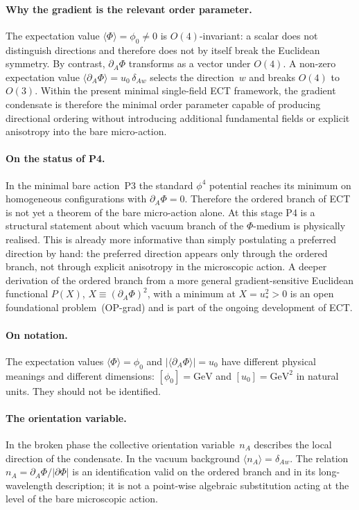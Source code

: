 \documentclass[11pt,a4paper]{article}
\numberwithin{equation}{section}
\begin{document}
\paragraph{Why the gradient is the relevant order parameter.}
The expectation value $\langle\Phi\rangle=\phi_0\neq 0$ is
$O(4)$-invariant: a scalar does not distinguish directions and therefore
does not by itself break the Euclidean symmetry.
By contrast, $\partial_A\Phi$ transforms as a vector under $O(4)$.
A non-zero expectation value
$\langle\partial_A\Phi\rangle = u_0\,\delta_{Aw}$
selects the direction~$w$ and breaks $O(4)$ to $O(3)$.
Within the present minimal single-field ECT framework, the gradient
condensate is therefore the minimal order parameter capable of producing
directional ordering without introducing additional fundamental fields
or explicit anisotropy into the bare micro-action.

\paragraph{On the status of P4.}
In the minimal bare action~P3 the standard $\phi^4$ potential reaches
its minimum on homogeneous configurations with $\partial_A\Phi=0$.
Therefore the ordered branch of ECT is not yet a theorem of the bare
micro-action alone.
At this stage P4 is a structural statement about which vacuum branch
of the $\Phi$-medium is physically realised.
This is already more informative than simply postulating a preferred
direction by hand: the preferred direction appears only through the
ordered branch, not through explicit anisotropy in the microscopic
action.
A deeper derivation of the ordered branch from a more general
gradient-sensitive Euclidean functional $P(X)$,
$X\equiv(\partial_A\Phi)^2$, with a minimum at $X=u_*^2>0$ is
an open foundational problem~(OP-grad) and is part of the ongoing
development of ECT.

\paragraph{On notation.}
The expectation values $\langle\Phi\rangle=\phi_0$ and
$|\langle\partial_A\Phi\rangle|=u_0$ have different physical meanings
and different dimensions:
$[\phi_0]=\mathrm{GeV}$ and $[u_0]=\mathrm{GeV}^2$ in natural units.
They should not be identified.

\paragraph{The orientation variable.}
In the broken phase the collective orientation variable~$n_A$
describes the local direction of the condensate.
In the vacuum background $\langle n_A\rangle=\delta_{Aw}$.
The relation $n_A=\partial_A\Phi/|\partial\Phi|$ is an identification
valid on the ordered branch and in its long-wavelength description;
it is not a point-wise algebraic substitution acting at the level of
the bare microscopic action.
\end{document}
